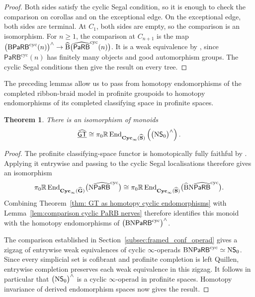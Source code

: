 \documentclass{amsart}
\newcommand{\sSet}{\mathbf{S}}
\newcommand{\Grpd}{\mathbf{G}}
\newcommand{\PaRB}{\mathsf{PaRB}}
\newcommand{\Cyc}{\mathbf{Cyc}}
\newcommand{\End}{\operatorname{End}}
\newcommand{\cs}{\textnormal{B}}
\newcommand{\nerve}{\textnormal{N}}
\newcommand{\GT}{\widehat{\mathsf{GT}}}
\newtheorem{thm}[theorem]{Theorem}%
\theoremstyle{definition}
\numberwithin{equation}{section}
\begin{document}
\begin{proof}
Both sides satisfy the cyclic Segal condition, so it is enough to
check the comparison on corollas and on the exceptional edge. On the
exceptional edge, both sides are terminal. At $C_1$, both sides are
empty, so the comparison is an isomorphism. For $n\geq1$, the
comparison at $C_{n+1}$ is the map
$\bigl(\cs\PaRB^{\mathrm{cyc}}(n)\bigr)^{\wedge}
\to
\widehat{\cs}\bigl(\widehat{\PaRB}^{\mathrm{cyc}}(n)\bigr)$.
It is a weak equivalence by
\cite[Proposition~5.9]{Horel_profinite_groupoids}, since
$\PaRB^{\mathrm{cyc}}(n)$ has finitely many objects and good
automorphism groups. The cyclic Segal conditions then give the
result on every tree.
\end{proof}

The preceding lemmas allow us to pass from homotopy endomorphisms of
the completed ribbon-braid model in profinite groupoids to homotopy
endomorphisms of its completed classifying space in profinite spaces.

\begin{thm}
\label{thm: GT acts on widehat csN PaRB}
There is an isomorphism of monoids
\[
\underline{\GT}
\cong
\pi_0\mathbb R\End_{\Cyc_\infty(\widehat{\sSet})}
\left(
\bigl(\nerve\mathsf S_0\bigr)^{\wedge}
\right).
\]
\end{thm}

\begin{proof}
The profinite classifying-space functor is homotopically fully
faithful by
\cite[Proposition~5.7]{Horel_profinite_groupoids}. Applying it
entrywise and passing to the cyclic Segal localisations therefore
gives an isomorphism
\[
\pi_0\mathbb R\End_{\Cyc_\infty(\widehat{\Grpd})}
\bigl(\nerve\widehat{\PaRB}^{\mathrm{cyc}}\bigr)
\cong
\pi_0\mathbb R\End_{\Cyc_\infty(\widehat{\sSet})}
\bigl(\widehat{\cs}\nerve\widehat{\PaRB}^{\mathrm{cyc}}\bigr).
\]
Combining Theorem~\ref{thm: GT as homotopy cyclic endomorphisms}
with Lemma~\ref{lem:comparison cyclic PaRB nerves} therefore
identifies this monoid with the homotopy endomorphisms of
$\bigl(\cs\nerve\PaRB^{\mathrm{cyc}}\bigr)^{\wedge}$.

The comparison established in
Section~\ref{subsec:framed_conf_operad} gives a zigzag of entrywise
weak equivalences of cyclic $\infty$-operads
$\cs\nerve\PaRB^{\mathrm{cyc}}\simeq\nerve\mathsf S_0$.
Since every simplicial set is cofibrant and profinite completion is
left Quillen, entrywise completion preserves each weak equivalence
in this zigzag. It follows in particular that
$\bigl(\nerve\mathsf S_0\bigr)^{\wedge}$ is a cyclic
$\infty$-operad in profinite spaces. Homotopy invariance of derived
endomorphism spaces now gives the result.
\end{proof}
\end{document}
